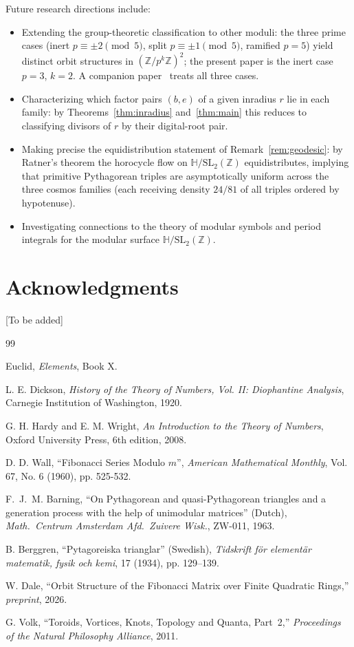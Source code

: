 \documentclass[12pt]{article}
\begin{document}
Future research directions include:
\begin{itemize}
\item Extending the group-theoretic classification to other moduli: the three prime cases
  (inert $p\equiv\pm2\pmod5$, split $p\equiv\pm1\pmod5$, ramified $p=5$) yield distinct
  orbit structures in $(\mathbb{Z}/p^k\mathbb{Z})^2$; the present paper is the inert case
  $p=3$, $k=2$.  A companion paper~\cite{modular-dynamics} treats all three cases.
\item Characterizing which factor pairs $(b,e)$ of a given inradius $r$ lie in each
  family: by Theorems~\ref{thm:inradius} and~\ref{thm:main} this reduces to classifying
  divisors of $r$ by their digital-root pair.
\item Making precise the equidistribution statement of Remark~\ref{rem:geodesic}:
  by Ratner's theorem the horocycle flow on $\mathbb{H}/\mathrm{SL}_2(\mathbb{Z})$
  equidistributes, implying that primitive Pythagorean triples are asymptotically
  uniform across the three cosmos families (each receiving density $24/81$ of all
  triples ordered by hypotenuse).
\item Investigating connections to the theory of modular symbols and period integrals
  for the modular surface $\mathbb{H}/\mathrm{SL}_2(\mathbb{Z})$.
\end{itemize}

\section*{Acknowledgments}

[To be added]

\begin{thebibliography}{99}

Euclid, \emph{Elements}, Book X.

L. E. Dickson, \emph{History of the Theory of Numbers, Vol. II: Diophantine Analysis}, Carnegie Institution of Washington, 1920.

G. H. Hardy and E. M. Wright, \emph{An Introduction to the Theory of Numbers}, Oxford University Press, 6th edition, 2008.

D. D. Wall, ``Fibonacci Series Modulo $m$'', \emph{American Mathematical Monthly}, Vol. 67, No. 6 (1960), pp. 525-532.

F.~J.~M. Barning, ``On Pythagorean and quasi-Pythagorean triangles and a generation process with the help of unimodular matrices'' (Dutch), \emph{Math.\ Centrum Amsterdam Afd.\ Zuivere Wisk.}, ZW-011, 1963.

B. Berggren, ``Pytagoreiska trianglar'' (Swedish), \emph{Tidskrift f{\"o}r element{\"a}r matematik, fysik och kemi}, 17 (1934), pp. 129--139.

W. Dale, ``Orbit Structure of the Fibonacci Matrix over Finite Quadratic Rings,''
\emph{preprint}, 2026.

G. Volk, ``Toroids, Vortices, Knots, Topology and Quanta, Part~2,''
\emph{Proceedings of the Natural Philosophy Alliance}, 2011.

\end{thebibliography}
\end{document}
